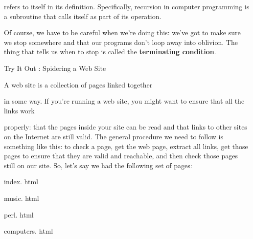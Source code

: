 \documentclass[a4paper,11pt]{book}
\begin{document}
\noindent refers to itself in its definition. Specifically, recursion in computer programming is a subroutine that calls itself as part of its operation.

\noindent 

\noindent Of course, we have to be careful when we're doing this: we've got to make sure we stop somewhere and that our programs don't loop away into oblivion. The thing that tells us when to stop is called the \textbf{terminating condition}.

\noindent 

\noindent 

\noindent Try It Out : Spidering a Web Site

\noindent 

\noindent A web site is a collection of pages linked together

\noindent in some way. If you're running a web site, you might want to ensure that all the links work

\noindent properly: that the pages inside your site can be read and that links to other sites on the Internet are still valid. The general procedure we need to follow is something like this: to check a page, get the web page, extract all links, get those pages to ensure that they are valid and reachable, and then check those pages still on our site.  So, let's say we had the following set of pages:

\noindent 

\noindent 

\noindent 

\noindent index. html

\noindent 

\noindent 

\noindent 

\noindent 

\noindent music. html

\noindent 

\noindent 

\noindent 

\noindent perl. html

\noindent 

\noindent 

\noindent 

\noindent 

\noindent computers. html

\noindent 

\noindent 

\noindent 
\end{document}
